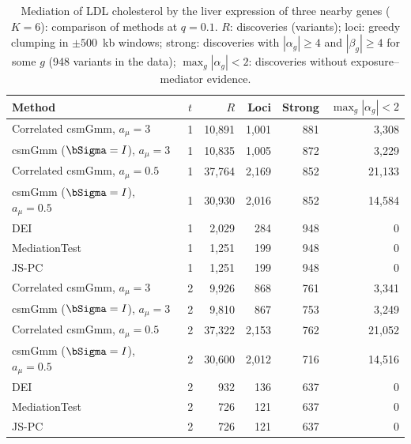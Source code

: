 \begin{table}[htbp]
\centering
\caption{Mediation of LDL cholesterol by the liver expression of three nearby genes ($K=6$): comparison of methods at $q=0.1$. $R$: discoveries (variants); loci: greedy clumping in $\pm500$~kb windows; strong: discoveries with $|\alpha_g|\ge4$ and $|\beta_g|\ge4$ for some $g$ (948 variants in the data); $\max_g|\alpha_g|<2$: discoveries without exposure--mediator evidence.}
\label{tab:med-ldl-methods}
\small
\begin{tabular}{l c rrrr}
\toprule
Method & $t$ & $R$ & Loci & Strong & $\max_g|\alpha_g|<2$\\
\midrule
Correlated csmGmm, $a_\mu=3$ & 1 & 10{,}891 & 1{,}001 & 881 & 3{,}308\\
csmGmm ($\bSigma=I$), $a_\mu=3$ & 1 & 10{,}835 & 1{,}005 & 872 & 3{,}229\\
Correlated csmGmm, $a_\mu=0.5$ & 1 & 37{,}764 & 2{,}169 & 852 & 21{,}133\\
csmGmm ($\bSigma=I$), $a_\mu=0.5$ & 1 & 30{,}930 & 2{,}016 & 852 & 14{,}584\\
DEI & 1 & 2{,}029 & 284 & 948 & 0\\
MediationTest & 1 & 1{,}251 & 199 & 948 & 0\\
JS-PC & 1 & 1{,}251 & 199 & 948 & 0\\
\midrule
Correlated csmGmm, $a_\mu=3$ & 2 & 9{,}926 & 868 & 761 & 3{,}341\\
csmGmm ($\bSigma=I$), $a_\mu=3$ & 2 & 9{,}810 & 867 & 753 & 3{,}249\\
Correlated csmGmm, $a_\mu=0.5$ & 2 & 37{,}322 & 2{,}153 & 762 & 21{,}052\\
csmGmm ($\bSigma=I$), $a_\mu=0.5$ & 2 & 30{,}600 & 2{,}012 & 716 & 14{,}516\\
DEI & 2 & 932 & 136 & 637 & 0\\
MediationTest & 2 & 726 & 121 & 637 & 0\\
JS-PC & 2 & 726 & 121 & 637 & 0\\
\bottomrule
\end{tabular}
\end{table}
